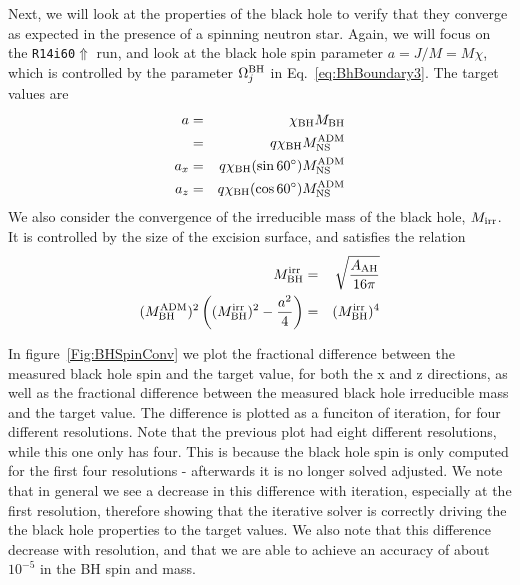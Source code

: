 Next, we will look at the properties of the black hole to verify that they converge as expected in the presence of a spinning neutron star. Again, we will focus on the {\tt R14i60$\Uparrow$} run, and look at the black hole spin parameter $a=J/M=M\chi$, which is controlled by the parameter $\Omega_j^{\rm BH}$ in Eq.~\ref{eq:BhBoundary3}. The target values are
\begin{eqnarray}
a&=&\chi_{\rm BH}M_{\rm BH}\\
&=&q\chi_{\rm BH}M_{\rm NS}^{\rm ADM}\\
a_x&=&q\chi_{\rm BH}(\sin60^{\circ})M_{\rm NS}^{\rm ADM}\\
a_z&=&q\chi_{\rm BH}(\cos60^{\circ})M_{\rm NS}^{\rm ADM}
\end{eqnarray}
We also consider the convergence of the irreducible mass of the black hole, $M_{\rm irr}$. It is controlled by the size of the excision surface, and satisfies the relation
\begin{eqnarray}
M_{\rm BH}^{\rm irr}&=&\sqrt{\frac{A_{\rm AH}}{16\pi}}\\
(M_{\rm BH}^{\rm ADM})^2\left((M_{\rm BH}^{\rm irr})^2-\frac{a^2}{4}\right)&=&(M_{\rm BH}^{\rm irr})^4
\end{eqnarray}

In figure~\ref{Fig:BHSpinConv} we plot the fractional difference between the measured black hole spin and the target value, for both the x and z directions, as well as the fractional difference between
the measured black hole irreducible mass and the target value. The
difference is plotted as a funciton of iteration, for four different
resolutions. Note that the previous plot had eight different
resolutions, while this one only has four. This is because the black
hole spin is only computed for the first four resolutions - afterwards
it is no longer solved adjusted.  We note that in general we see a decrease in this difference with iteration, especially at the first resolution, therefore showing that the iterative solver is correctly driving the the black hole properties to the target values.
We also note that this difference decrease with resolution, and that
we are able to achieve an accuracy of about $10^{-5}$ in the BH spin
and mass. 

